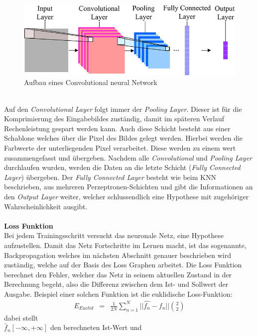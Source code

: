 \documentclass[a4paper,12pt,oneside]{article}
\begin{document}
\begin{figure}
	[h]
	\centering
	\includegraphics[scale=0.5]{Sources/cnnet.jpg}
	\caption{Aufbau eines Convolutional neural Network \cite{info7040061}}
	\label{img:cnn}
\end{figure}\\
Auf den \textit{Convolutional Layer} folgt immer der \textit{Pooling Layer}. Dieser ist für die Komprimierung des Eingabebildes zuständig, damit im späteren Verlauf Rechenleistung gespart werden kann. Auch diese Schicht besteht aus einer Schablone welches über die Pixel des Bildes gelegt werden. Hierbei werden die Farbwerte der unterliegenden Pixel verarbeitet. Diese werden zu einem wert zusammengefasst und übergeben. Nachdem alle \textit{Convolutional} und \textit{Pooling Layer} durchlaufen wurden, werden die Daten an die letzte Schicht (\textit{Fully Connected Layer}) übergeben. Der \textit{Fully Connected Layer} besteht wie beim KNN beschrieben, aus mehreren Perzeptronen-Schichten und gibt die Informationen an den \textit{Output Layer} weiter, welcher schlussendlich eine Hypothese mit zugehöriger Wahrscheinlichkeit ausgibt.\\\\
\textbf{Loss Funktion}\\
Bei jedem Trainingsschritt versucht das neuronale Netz, eine Hypothese aufzustellen. Damit das Netz Fortschritte im Lernen macht, ist das sogenannte, Backpropagation welches im nächsten Abschnitt genauer beschrieben wird zuständig, welche auf der Basis des Loss Graphen arbeitet. Die Loss Funktion berechnet den Fehler, welcher das Netz in seinem aktuellen Zustand in der Berechnung begeht, also die Differenz zwischen dem Ist- und Sollwert der Ausgabe. Beispiel einer solchen Funktion ist die euklidische Loss-Funktion:
\begin{eqnarray} E_{Euclid}&=&\frac{1}{2N} \sum_{n=1}^N || \hat{f_{n}}-f_{n} || \binom{2}{2} \end{eqnarray}
dabei stellt\\

	$\hat{f}_{n}[-\infty,+\infty]$ den berechneten Ist-Wert und
	
\end{document}
